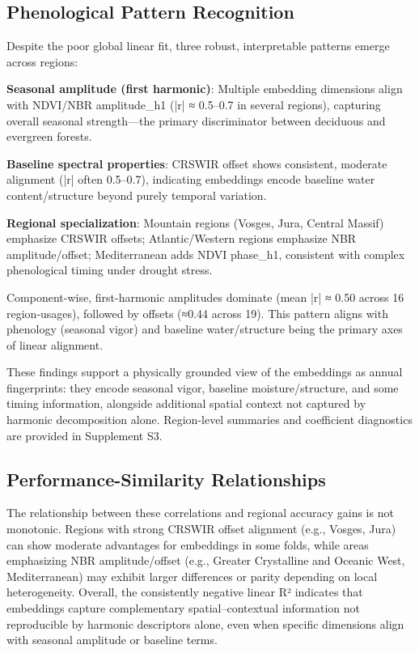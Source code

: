 \documentclass[utf8]{FrontiersinHarvard}
\begin{document}
\subsection{Phenological Pattern Recognition}

Despite the poor global linear fit, three robust, interpretable patterns emerge across regions:

\textbf{Seasonal amplitude (first harmonic)}: Multiple embedding dimensions align with NDVI/NBR amplitude\_h1 (|r| ≈ 0.5–0.7 in several regions), capturing overall seasonal strength—the primary discriminator between deciduous and evergreen forests.

\textbf{Baseline spectral properties}: CRSWIR offset shows consistent, moderate alignment (|r| often 0.5–0.7), indicating embeddings encode baseline water content/structure beyond purely temporal variation.

\textbf{Regional specialization}: Mountain regions (Vosges, Jura, Central Massif) emphasize CRSWIR offsets; Atlantic/Western regions emphasize NBR amplitude/offset; Mediterranean adds NDVI phase\_h1, consistent with complex phenological timing under drought stress.

Component-wise, first-harmonic amplitudes dominate (mean |r| ≈ 0.50 across 16 region-usages), followed by offsets (≈0.44 across 19). This pattern aligns with phenology (seasonal vigor) and baseline water/structure being the primary axes of linear alignment.

These findings support a physically grounded view of the embeddings as annual fingerprints: they encode seasonal vigor, baseline moisture/structure, and some timing information, alongside additional spatial context not captured by harmonic decomposition alone. Region-level summaries and coefficient diagnostics are provided in Supplement S3.

\subsection{Performance-Similarity Relationships}

The relationship between these correlations and regional accuracy gains is not monotonic. Regions with strong CRSWIR offset alignment (e.g., Vosges, Jura) can show moderate advantages for embeddings in some folds, while areas emphasizing NBR amplitude/offset (e.g., Greater Crystalline and Oceanic West, Mediterranean) may exhibit larger differences or parity depending on local heterogeneity. Overall, the consistently negative linear R² indicates that embeddings capture complementary spatial–contextual information not reproducible by harmonic descriptors alone, even when specific dimensions align with seasonal amplitude or baseline terms.
\end{document}
